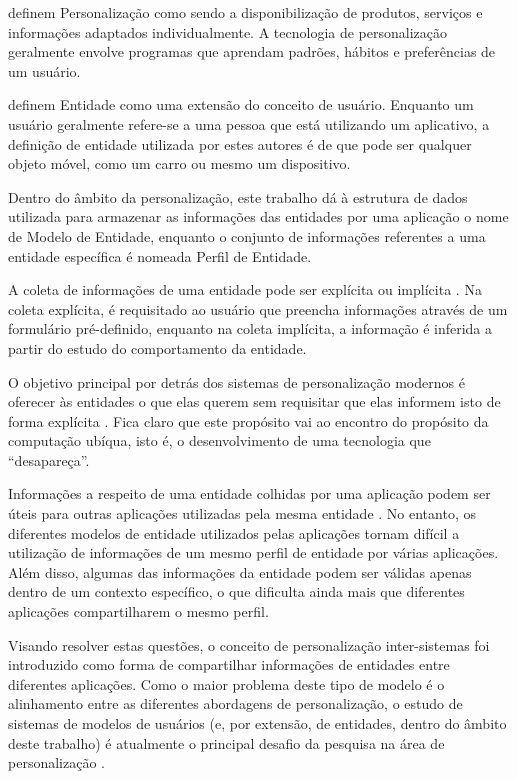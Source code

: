  definem Personalização como sendo a disponibilização de produtos, serviços e informações adaptados individualmente. A tecnologia de personalização geralmente envolve programas que aprendam padrões, hábitos e preferências de um usuário.

 definem Entidade como uma extensão do conceito de usuário. Enquanto um usuário geralmente refere-se a uma pessoa que está utilizando um aplicativo, a definição de entidade utilizada por estes autores é de que pode ser qualquer objeto móvel, como um carro ou mesmo um dispositivo.

Dentro do âmbito da personalização, este trabalho dá à estrutura de dados utilizada para armazenar as informações das entidades por uma aplicação o nome de Modelo de Entidade, enquanto o conjunto de informações referentes a uma entidade específica é nomeada Perfil de Entidade.

A coleta de informações de uma entidade pode ser explícita ou implícita \cite{viviani10}. Na coleta explícita, é requisitado ao usuário que preencha informações através de um formulário pré-definido, enquanto na coleta implícita, a informação é inferida a partir do estudo do comportamento da entidade.

O objetivo principal por detrás dos sistemas de personalização modernos é oferecer às entidades o que elas querem sem requisitar que elas informem isto de forma explícita \cite{mulvenna00}. Fica claro que este propósito vai ao encontro do propósito da computação ubíqua, isto é, o desenvolvimento de uma tecnologia que ``desapareça''.

Informações a respeito de uma entidade colhidas por uma aplicação podem ser úteis para outras aplicações utilizadas pela mesma entidade \cite{viviani10}. No entanto, os diferentes modelos de entidade utilizados pelas aplicações tornam difícil a utilização de informações de um mesmo perfil de entidade por várias aplicações. Além disso, algumas das informações da entidade podem ser válidas apenas dentro de um contexto específico, o que dificulta ainda mais que diferentes aplicações compartilharem o mesmo perfil.

Visando resolver estas questões, o conceito de personalização inter-sistemas foi introduzido \cite{niederee04} como forma de compartilhar informações de entidades entre diferentes aplicações. Como o maior problema deste tipo de modelo é o alinhamento entre as diferentes abordagens de personalização, o estudo de sistemas de modelos de usuários (e, por extensão, de entidades, dentro do âmbito deste trabalho) é atualmente o principal desafio da pesquisa na área de personalização \cite{viviani10}.

